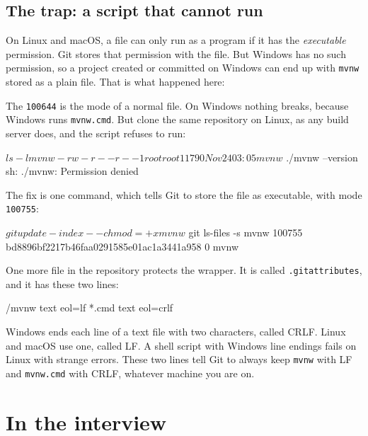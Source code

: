 \subsection*{The trap: a script that cannot run}

On Linux and macOS, a file can only run as a program if it has the
\emph{executable} permission. Git stores that permission with the file. But
Windows has no such permission, so a project created or committed on Windows
can end up with \texttt{mvnw} stored as a plain file. That is what happened
here:


The \texttt{100644} is the mode of a normal file. On Windows nothing breaks,
because Windows runs \texttt{mvnw.cmd}. But clone the same repository on
Linux, as any build server does, and the script refuses to run:

\begin{terminal}
$ ls -l mvnw
-rw-r--r--    1 root     root         11790 Nov 24 03:05 mvnw
$ ./mvnw --version
sh: ./mvnw: Permission denied
\end{terminal}

The fix is one command, which tells Git to store the file as executable,
with mode \texttt{100755}:

\begin{terminal}
$ git update-index --chmod=+x mvnw
$ git ls-files -s mvnw
100755 bd8896bf2217b46faa0291585e01ac1a3441a958 0	mvnw
\end{terminal}

One more file in the repository protects the wrapper. It is called
\texttt{.gitattributes}, and it has these two lines:

\begin{code}[language={}]
/mvnw text eol=lf
*.cmd text eol=crlf
\end{code}

Windows ends each line of a text file with two characters, called CRLF.
Linux and macOS use one, called LF. A shell script with Windows line endings
fails on Linux with strange errors. These two lines tell Git to always keep
\texttt{mvnw} with LF and \texttt{mvnw.cmd} with CRLF, whatever machine you
are on.

\section*{In the interview}

